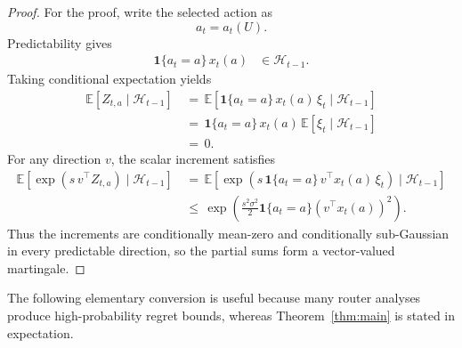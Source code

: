 \documentclass{article} %
\begin{document}
\begin{proof}
For the proof, write the selected action as
\begin{equation}
\label{eq:app-short-action}
a_t
=
a_t(U).
\end{equation}
Predictability gives
\begin{align}
\label{eq:app-mart-predictable-product}
\mathbf{1}\{a_t=a\}\,x_t(a)
&\in
\mathcal{H}_{t-1}.
\end{align}
Taking conditional expectation yields
\begin{align}
\label{eq:app-mart-zero}
\mathbb{E}[Z_{t,a}\mid \mathcal{H}_{t-1}]
&\,=\,
\mathbb{E}\!\left[
\mathbf{1}\{a_t=a\}\,x_t(a)\,\xi_t
\mid
\mathcal{H}_{t-1}
\right]
\\
&\,=\,
\mathbf{1}\{a_t=a\}\,x_t(a)\,
\mathbb{E}[\xi_t\mid \mathcal{H}_{t-1}]
\\
&\,=\,
0.
\end{align}
For any direction \(v\), the scalar increment satisfies
\begin{align}
\label{eq:app-mart-subg-direction}
\mathbb{E}\!\left[
\exp\!\left(s\,v^\top Z_{t,a}\right)
\mid
\mathcal{H}_{t-1}
\right]
&\,=\,
\mathbb{E}\!\left[
\exp\!\left(
s\,\mathbf{1}\{a_t=a\}\,v^\top x_t(a)\,\xi_t
\right)
\mid
\mathcal{H}_{t-1}
\right]
\\
&\,\le\,
\exp\!\left(
\frac{s^2\sigma^2}{2}
\mathbf{1}\{a_t=a\}
(v^\top x_t(a))^2
\right).
\end{align}
Thus the increments are conditionally mean-zero and conditionally sub-Gaussian in every predictable direction, so the partial sums form a vector-valued martingale.
\end{proof}

The following elementary conversion is useful because many router analyses produce high-probability regret bounds, whereas Theorem~\ref{thm:main} is stated in expectation.
\end{document}
